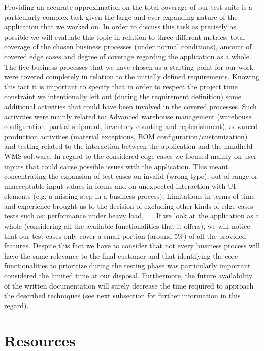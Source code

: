 Providing an accurate approximation on the total coverage of our test suite is a particularly complex task given the large and ever-expanding nature of the application that we worked on. In order to discuss this task as precisely as possible we will evaluate this topic in relation to three different metrics: total coverage of the chosen business processes (under normal conditions), amount of covered edge cases and degree of coverage regarding the application as a whole. 
The five business processes that we have chosen as a starting point for our work were covered completely in relation to the initially defined requirements. Knowing this fact it is important to specify that in order to respect the project time constraint we intentionally left out (during the requirement definition) some additional activities that could have been involved in the covered processes. Such activities were mainly related to: Advanced warehouse management (warehouse configuration, partial shipment, inventory counting and replenishment), advanced production activities (material exceptions, BOM configuration/customization) and testing related to the interaction between the application and the handheld WMS software. In regard to the considered edge cases we focused mainly on user inputs that could cause possible issues with the application. This meant concentrating the expansion of test cases on invalid (wrong type), out of range or unacceptable input values in forms and on unexpected interaction with UI elements (e.g. a missing step in a business process). Limitations in terms of time and experience brought us to the decision of excluding other kinds of edge cases tests such as: performance under heavy load, ....
If we look at the application as a whole (considering all the available functionalities that it offers), we will notice that our test cases only cover a small portion (around 5\%) of all the provided features. Despite this fact we have to consider that not every business process will have the same relevance to the final customer and that identifying the core functionalities to prioritize during the testing phase was particularly important considered the limited time at our disposal. Furthermore, the future availability of the written documentation will surely decrease the time required to approach the described techniques (see next subsection for further information in this regard).

\section{Resources} 

